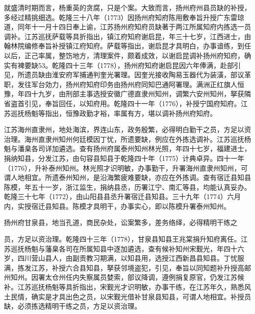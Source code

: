 就盛清时期而言，杨重英的贪腐，只是个案。大致而言，扬州府州县员缺的补授，多经过精挑细选。乾隆三十八年（1773）因扬州府知府陈用敷奉旨升授广东雷琼道，同年十一月十四日奉上谕，江苏扬州府知府员缺著于两江所属知府内拣选一员调补。江苏巡抚萨载等具折指出，镇江府知府谢启昆，年三十七岁，江西进士，由翰林院编修奉旨补授镇江府知府。萨载等指出，谢启昆才具明白，办事谙练，到任以后，正己率属，整饬地方，清理案件，颇着成效，以谢启昆调补扬州府知府，确实有裨要缺53。乾隆四十三年（1778），扬州府知府谢启昆因六年俸满，赴部引见，所遗员缺由淮安府军捕通判奎光署理。因奎光接收陶易玉器代为装潢，部议革职，发往军台効力，扬州府知府印务由扬州府同知巴通阿署理。满洲正红旗人恒豫，年四十九岁，由刑部主事选授安徽广德直隶州知州，调繁六安州知州，拏获隣省盗首引见，奉旨回任，以知府用。乾隆四十一年（1776），补授宁国府知府。江苏巡抚杨魁等指出，恒豫政勤才裕，率属有方，堪以调补扬州府知府。

江苏海州直隶州，地处海滨，界连山东，政务殷繁，必得明白勤干之员，方足以资治理。海州直隶州知州何廷模因丁忧，所遗要缺，例应在外拣选调补。江苏巡抚杨魁与潘臬各司详加遴选。查有扬州府属泰州知州林光照，年四十七岁，福建进士，捐纳知县，分发江苏，由句容县知县于乾隆四十年（1775）计典卓异。四十一年（1776），升补泰州知州。林光照才识明敏，办事勤干，升署海州直隶州知州，可谓人地相宜。所遗泰州知州，是沿海繁疲难要缺，亦应在外拣调。查有宿迁县知县陈模，年五十一岁，浙江监生，捐纳县丞，历署江宁、南汇等县，均能认真妥办。乾隆三十七年（1772），由山阳县县丞升署宿迁县知县。三十九年（1774）六月内，实授宿迁县知县。陈模才具明干，办事实心，即以陈模升署泰州知州。

扬州府甘泉县，地当孔道，商民杂处，讼案繁多，差务络绎，必得精明干练之

\vfill
\begin{BookNotes}
\end{BookNotes}

\noindent 员，方足以资治理。乾隆四十三年（1778），甘泉县知县王兆棠捐升知府离任。江苏巡抚杨魁与藩臬各司在所属知县中逐加遴选，查有候补知州宋觐光，年四十六岁，四川营山县人，由副贡教习期满，以知县用，选授江西新昌县知县。丁忧服满，拣发江苏，补授六合县知县，拏获邻境盗犯，引见，奉旨以同知题补升授高邮州知州。因署太仓州任内失察属员婪索，部议降调，遵例捐复原官，仍发江苏候补。江苏巡抚杨魁等具折指出，宋觐光才识明敏，办事干练，在江苏年久，熟悉风土民情，确实是才具出色之员，以宋觐光借补甘泉县知县，可谓人地相宜。补授员缺，必须拣选精明干练之员，方足以资治理。

